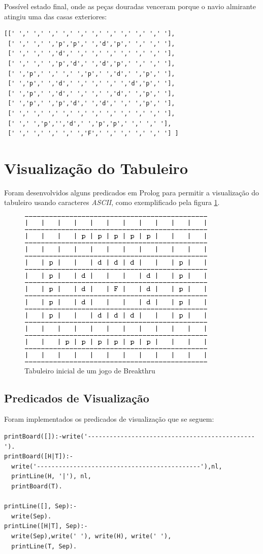 \documentclass[a4paper]{article}
\begin{document}
Possível estado final, onde as peças douradas venceram porque o navio almirante atingiu uma das casas exteriores:
\begin{verbatim}
[[' ',' ',' ',' ',' ',' ',' ',' ',' ',' ',' '],
 [' ',' ',' ','p','p',' ','d','p',' ',' ',' '],
 [' ',' ',' ','d',' ',' ',' ',' ',' ',' ',' '],
 [' ',' ',' ','p','d',' ','d','p',' ',' ',' '],
 [' ','p',' ',' ',' ','p',' ','d',' ','p',' '],
 [' ','p',' ','d',' ',' ',' ',' ','d','p',' '],
 [' ','p',' ','d',' ',' ',' ','d',' ','p',' '],
 [' ','p',' ','p','d',' ','d',' ',' ','p',' '],
 [' ',' ',' ',' ',' ',' ',' ',' ',' ',' ',' '],
 [' ',' ','p','','d',' ','p','p',' ',' ',' '],
 [' ',' ',' ',' ',' ','F',' ',' ',' ',' ',' '] ]
\end{verbatim}


\section{Visualização do Tabuleiro}

Foram desenvolvidos alguns predicados em Prolog para permitir a visualização do tabuleiro usando caracteres \textit{ASCII}, como exemplificado pela figura \ref{fig:example}.
\begin{figure}
\centering
\includegraphics[scale=1]{Breakthru_initial_sicstus.png}
\caption{Tabuleiro inicial de um jogo de Breakthru}
\label{fig:example}
\end{figure}

\subsection{Predicados de Visualização}
Foram implementados os predicados de visualização que se seguem:

\begin{verbatim}
printBoard([]):-write('----------------------------------------------').
printBoard([H|T]):-
  write('---------------------------------------------'),nl,
  printLine(H, '|'), nl,
  printBoard(T).

printLine([], Sep):-
  write(Sep).
printLine([H|T], Sep):-
  write(Sep),write(' '), write(H), write(' '),
  printLine(T, Sep).
\end{verbatim}
\end{document}

